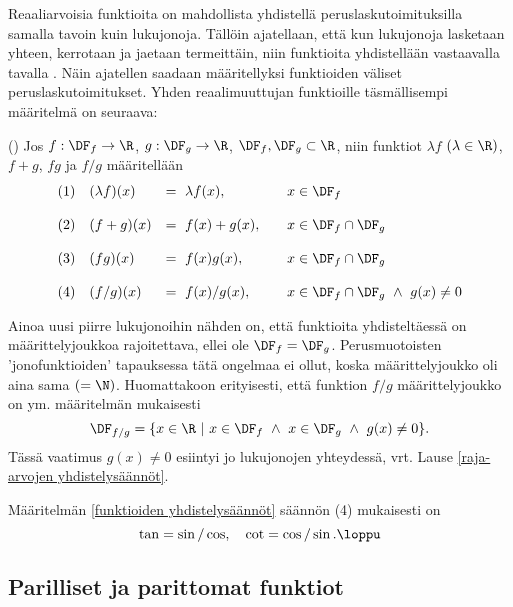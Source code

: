 Reaaliarvoisia funktioita on mahdollista yhdistellä peruslaskutoimituksilla samalla tavoin kuin 
lukujonoja. Tällöin ajatellaan, että kun lukujonoja lasketaan yhteen, kerrotaan ja jaetaan 
termeittäin, niin funktioita yhdistellään vastaavalla tavalla . Näin ajatellen
saadaan määritellyksi funktioiden väliset peruslaskutoimitukset. Yhden reaalimuuttujan
funktioille täsmällisempi määritelmä on seuraava:
\begin{Def} () \label{funktioiden yhdistelysäännöt}
Jos $f:\DF_f \rightarrow \R$, $g:\DF_g\rightarrow\R$, $\DF_f,\DF_g \subset \R$, niin funktiot
$\lambda f$ $(\lambda\in\R)$, $f+g$, $fg$ ja $f/g$ määritellään
\[
\begin{array}{clll}
(1) & (\lambda f)(x)&=\ \lambda f(x), \quad & x \in \DF_f \\ \\
(2) & (f+g)(x)&=\ f(x)+g(x), \quad & x\in \DF_f \cap \DF_g \\ \\ 
(3) & (fg)(x)&=\ f(x)g(x), \quad & x\in \DF_f \cap \DF_g \\ \\
(4) & (f/g)(x)&=\ f(x)/g(x), \quad & x\in \DF_f \cap \DF_g\ \wedge\ g(x) \neq 0
\end{array} 
\]
\end{Def}
Ainoa uusi piirre lukujonoihin nähden on, että funktioita yhdisteltäessä on määrittelyjoukkoa 
rajoitettava, ellei ole $\DF_f=\DF_g$. Perusmuotoisten 'jonofunktioiden' tapauksessa tätä
ongelmaa ei ollut, koska määrittelyjoukko oli aina sama $(=\N)$. Huomattakoon erityisesti, että
funktion $f/g$ määrittelyjoukko on ym. määritelmän mukaisesti
\[
\DF_{f/g}=\{x\in\R \ | \ x\in\DF_f\ \wedge\ x\in\DF_g\ \wedge\ g(x)\neq 0\}.
\]
Tässä vaatimus $g(x)\neq 0$ esiintyi jo lukujonojen yhteydessä, vrt. Lause 
\ref{raja-arvojen yhdistelysäännöt}.
\begin{Exa}
Määritelmän \ref{funktioiden yhdistelysäännöt} säännön (4) mukaisesti on
\[
\tan=\sin/\cos, \quad \cot = \cos/\sin. \loppu
\]
\end{Exa}

\subsection{Parilliset ja parittomat funktiot}


